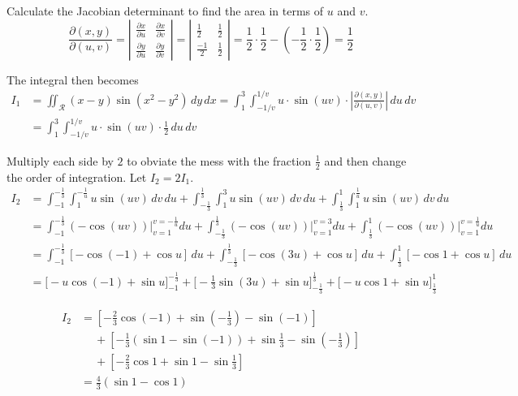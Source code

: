 \documentclass[a4paper, 12pt]{article}
\begin{document}
\begin{enumerate}[leftmargin=*,label=\textbf{\arabic*.}]
Calculate the Jacobian determinant to find the area in terms of $u$ and $v$.
\[
\frac{\partial(x,y)}{\partial(u,v)}=\left|\begin{array}{cc}
\displaystyle\frac{\partial x}{\partial u}&\displaystyle\frac{\partial x}{\partial v}\\[1em]
\displaystyle\frac{\partial y}{\partial u}&\displaystyle\frac{\partial y}{\partial v}
\end{array}\right|=\left|\begin{array}{cc}
\displaystyle\frac12&\displaystyle\frac12\\[1em]
\displaystyle\frac{-1}2&\displaystyle\frac12
\end{array}\right|=\frac12\cdot\frac12-\left(-\frac12\cdot\frac12\right)=\frac12
\]

The integral then becomes
\begin{align*}
I_1&=\iint_{\mathcal{R}}(x-y)\sin\left(x^2-y^2\right)\,dy\,dx=\int_1^3\int_{-1/v}^{1/v}u\cdot\sin(uv)\cdot\left|\frac{\partial(x,y)}{\partial(u,v)}\right|\,du\,dv\\[1em]&=\int_1^3\int_{-1/v}^{1/v}u\cdot\sin(uv)\cdot\frac12\,du\,dv
\end{align*}

Multiply each side by $2$ to obviate the mess with the fraction $\displaystyle\frac12$ and then change the order of integration. Let $I_2=2I_1$.
\begin{align*}
I_2&=\int_{-1}^{\textstyle-\frac13}\int_1^{\textstyle-\frac1u}u\sin(uv)\,dv\,du+\int_{\textstyle-\frac13}^{\textstyle\frac13}\int_1^3u\sin(uv)\,dv\,du+\int_{\textstyle\frac13}^1\int_1^{\textstyle\frac1u}u\sin(uv)\,dv\,du\\[1em]&=\int_{-1}^{\textstyle-\frac13}(-\cos(uv))\bigg|_{v=1}^{v=-\frac1u}du+\int_{\textstyle-\frac13}^{\textstyle\frac13}(-\cos(uv))\bigg|_{v=1}^{v=3}du+\int_{\textstyle\frac13}^1(-\cos(uv))\bigg|_{v=1}^{v=\frac1u}du\\[1em]&=\int_{-1}^{\textstyle-\frac13}[-\cos(-1)+\cos u]\,du+\int_{\textstyle-\frac13}^{\textstyle\frac13}[-\cos(3u)+\cos u]\,du+\int_{\textstyle\frac13}^1[-\cos1+\cos u]\,du\\[1em]&=\bigg[-u\cos(-1)+\sin u\bigg]_{-1}^{\textstyle-\frac13}+\bigg[-\frac13\sin(3u)+\sin u\bigg]_{\textstyle-\frac13}^{\textstyle\frac13}+\bigg[-u\cos1+\sin u\bigg]_{\textstyle\frac13}^1
\end{align*}

\begin{align*}
I_2&=\left[-\frac23\cos(-1)+\sin\left(-\frac13\right)-\sin(-1)\right]\\[1em]&\quad\:+\left[-\frac13\left(\sin1-\sin(-1)\right)+\sin\frac13-\sin\left(-\frac13\right)\right]\\[1em]&\quad\:+\left[-\frac23\cos1+\sin1-\sin\frac13\right]\\[1em]&=\frac43(\sin1-\cos1)
\end{align*}


\end{enumerate}
\end{document}
